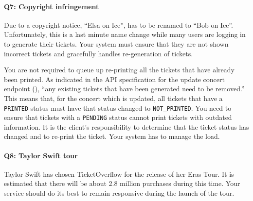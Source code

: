 \documentclass{csse4400}
\begin{document}
\paragraph{Q7: Copyright infringement}
Due to a copyright notice, ``Elsa on Ice'', has to be renamed to ``Bob on Ice''.
Unfortunately, this is a last minute name change while many users are logging in to generate their tickets.
Your system must ensure that they are not shown incorrect tickets and gracefully handles re-generation of tickets.

You are not required to queue up re-printing all the tickets that have already been printed.
As indicated in the API specification for the update concert endpoint
(),
``any existing tickets that have been generated need to be removed.''
This means that, for the concert which is updated, all tickets that have a \texttt{PRINTED}
status must have that status changed to \texttt{NOT\_PRINTED}.
You need to ensure that tickets with a \texttt{PENDING} status cannot print tickets with outdated information.
It is the client's responsibility to determine that the ticket status has changed and to re-print the ticket.
Your system has to manage the load.

\paragraph{Q8: Taylor Swift tour}
Taylor Swift has chosen TicketOverflow for the release of her Eras Tour.
It is estimated that there will be about 2.8 million purchases during this time.
Your service should do its best to remain responsive during the launch of the tour.
\end{document}
